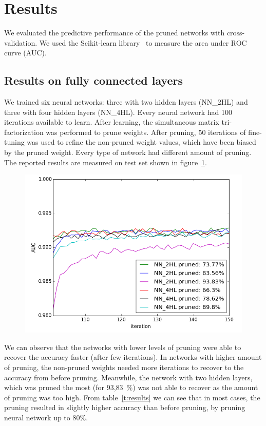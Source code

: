 \documentclass{article} %
\begin{document}
\section{Results}

We evaluated the predictive performance of the pruned networks with cross-validation. We 
used the Scikit-learn library~\cite{scikit-learn} to measure the area under ROC curve 
(AUC).


\subsection{Results on fully connected layers}

We trained six neural networks: three with two hidden layers (NN\_2HL) and three with four
hidden layers (NN\_4HL). Every neural network had 100 iterations available to learn. 
After learning, the simultaneous matrix tri-factorization was performed to prune weights. 
After pruning, 50 iterations of fine-tuning was used to refine the non-pruned weight 
values, which have been biased by the pruned weight. Every type of network had different 
amount of pruning. The reported results are measured on test set shown in 
figure~\ref{f:results}. 

\begin{figure}[!ht]
\centering
\includegraphics[width=0.8\linewidth]{nn.png}
\label{f:results}
\end{figure}

We can observe that the networks with lower levels of pruning were able to recover the 
accuracy faster (after few iterations). In networks with higher amount of pruning, the 
non-pruned weights needed more iterations to recover to the accuracy from before pruning. 
Meanwhile, the network with two hidden layers, which was pruned the most (for 93,83~\%) 
was not able to recover as the amount of pruning was too high. From table~\ref{t:results} 
we can see that in most cases, the pruning resulted in slightly higher accuracy than 
before pruning, by pruning neural network up to 80\%. 
\end{document}
